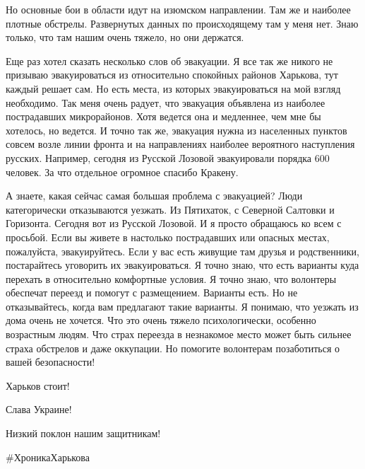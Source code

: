 Но основные бои в области идут на изюмском направлении. Там же и наиболее
плотные обстрелы. Развернутых данных по происходящему там у меня нет. Знаю
только, что там нашим очень тяжело, но они держатся. 

Еще раз хотел сказать несколько слов об эвакуации. Я все так же никого не
призываю эвакуироваться из относительно спокойных районов Харькова, тут каждый
решает сам. Но есть места, из которых эвакуироваться на мой взгляд необходимо.
Так меня очень радует, что эвакуация объявлена из наиболее пострадавших
микрорайонов. Хотя ведется она и медленнее, чем мне бы хотелось, но ведется. И
точно так же, эвакуация нужна из населенных пунктов совсем возле линии фронта и
на направлениях наиболее вероятного наступления русских. Например, сегодня из
Русской Лозовой эвакуировали порядка 600 человек. За что отдельное огромное
спасибо Кракену. 

А знаете, какая сейчас самая большая проблема с эвакуацией? Люди категорически
отказываются уезжать. Из Пятихаток, с Северной Салтовки и Горизонта. Сегодня
вот из Русской Лозовой. И я просто обращаюсь ко всем с просьбой. Если вы живете
в настолько пострадавших или опасных местах, пожалуйста, эвакуируйтесь. Если у
вас есть живущие там друзья и родственники, постарайтесь уговорить их
эвакуироваться. Я точно знаю, что есть варианты куда перехать в относительно
комфортные условия. Я точно знаю, что волонтеры обеспечат переезд и помогут с
размещением. Варианты есть. Но не отказывайтесь, когда вам предлагают такие
варианты. Я понимаю, что уезжать из дома очень не хочется. Что это очень тяжело
психологически, особенно возрастным людям. Что страх переезда в незнакомое
место может быть сильнее страха обстрелов и даже оккупации. Но помогите
волонтерам позаботиться о вашей безопасности!

Харьков стоит!

Слава Украине!

Низкий поклон нашим защитникам!

\#ХроникаХарькова

